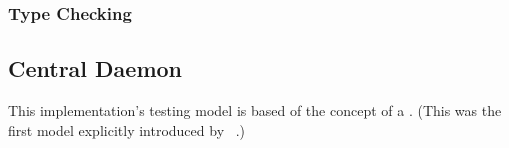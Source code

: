 \subsubsection{Type Checking}
\label{sec:logic-repr:self-stab-algor:type-checking}



\subsection{Central Daemon}
\label{sec:logic-repr:daemon}

This implementation's testing model is based of the concept of a .
(This was the first model explicitly introduced
  by \citeauthor{Dijkstra:1974:SSS:361179.361202}~\autocite{Dijkstra:1974:SSS:361179.361202}.)

